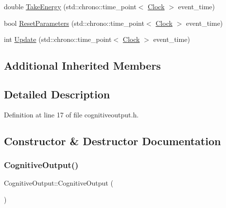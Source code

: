 \begin{DoxyCompactItemize}
\item 
double \hyperlink{class_cognitive_output_aae27d114676c68e02ae6e7ae36326ba8}{Take\+Energy} (std\+::chrono\+::time\+\_\+point$<$ \hyperlink{universe_8h_a0ef8d951d1ca5ab3cfaf7ab4c7a6fd80}{Clock} $>$ event\+\_\+time)
\item 
bool \hyperlink{class_cognitive_output_ab43b79aaadf75d18512c4379a77542cd}{Reset\+Parameters} (std\+::chrono\+::time\+\_\+point$<$ \hyperlink{universe_8h_a0ef8d951d1ca5ab3cfaf7ab4c7a6fd80}{Clock} $>$ event\+\_\+time)
\item 
int \hyperlink{class_cognitive_output_a2b4d33c7a529402c684d828efd25095a}{Update} (std\+::chrono\+::time\+\_\+point$<$ \hyperlink{universe_8h_a0ef8d951d1ca5ab3cfaf7ab4c7a6fd80}{Clock} $>$ event\+\_\+time)
\end{DoxyCompactItemize}
\subsection*{Additional Inherited Members}


\subsection{Detailed Description}


Definition at line 17 of file cognitiveoutput.\+h.



\subsection{Constructor \& Destructor Documentation}
\mbox{\label{class_cognitive_output_a743042cff5c36a76cd975767358e1bbf}} 
\subsubsection{\texorpdfstring{Cognitive\+Output()}{CognitiveOutput()}\hspace{0.1cm}{\footnotesize\ttfamily [1/4]}}
{\footnotesize\ttfamily Cognitive\+Output\+::\+Cognitive\+Output (\begin{DoxyParamCaption}{ }\end{DoxyParamCaption})\hspace{0.3cm}{\ttfamily [inline]}}




